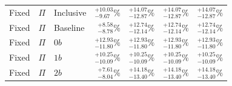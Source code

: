 \begin{tabular}{lllrrrr}
Fixed & $\Pi$ & Inclusive & $^{+10.03}_{-9.67}\%$ & $^{+14.07}_{-12.87}\%$ & $^{+14.07}_{-12.87}\%$ & $^{+14.07}_{-12.87}\%$ \\
Fixed & $\Pi$ & Baseline & $^{+8.58}_{-8.78}\%$ & $^{+12.74}_{-12.14}\%$ & $^{+12.74}_{-12.14}\%$ & $^{+12.74}_{-12.14}\%$ \\
Fixed & $\Pi$ & $0b$ & $^{+12.93}_{-11.80}\%$ & $^{+12.93}_{-11.80}\%$ & $^{+12.93}_{-11.80}\%$ & $^{+12.93}_{-11.80}\%$ \\
Fixed & $\Pi$ & $1b$ & $^{+10.25}_{-10.09}\%$ & $^{+10.25}_{-10.09}\%$ & $^{+10.25}_{-10.09}\%$ & $^{+10.25}_{-10.09}\%$ \\
Fixed & $\Pi$ & $2b$ & $^{+7.61}_{-8.04}\%$ & $^{+14.18}_{-13.40}\%$ & $^{+14.18}_{-13.40}\%$ & $^{+14.18}_{-13.40}\%$ \\
\bottomrule
\end{tabular}
